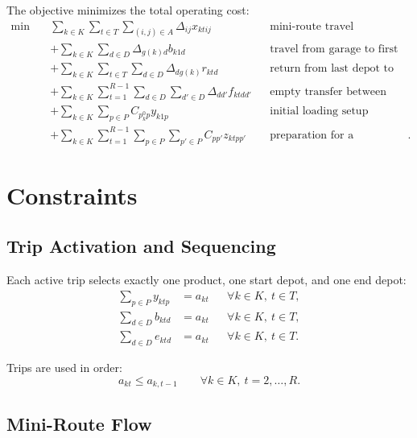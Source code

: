 \documentclass[11pt,a4paper]{article}
\begin{document}
The objective minimizes the total operating cost:
\begin{align}
\min \quad
& \sum_{k \in K}\sum_{t \in T}\sum_{(i,j)\in A}
    \Delta_{ij} x_{ktij}
    && \text{mini-route travel} \nonumber\\
& + \sum_{k \in K}\sum_{d \in D}
    \Delta_{g(k)d} b_{k1d}
    && \text{travel from garage to first depot} \nonumber\\
& + \sum_{k \in K}\sum_{t \in T}\sum_{d \in D}
    \Delta_{dg(k)} r_{ktd}
    && \text{return from last depot to garage} \nonumber\\
& + \sum_{k \in K}\sum_{t=1}^{R-1}\sum_{d \in D}\sum_{d' \in D}
    \Delta_{dd'} f_{ktdd'}
    && \text{empty transfer between depots} \nonumber\\
& + \sum_{k \in K}\sum_{p \in P}
    C_{p^0_k p} y_{k1p}
    && \text{initial loading setup} \nonumber\\
& + \sum_{k \in K}\sum_{t=1}^{R-1}\sum_{p \in P}\sum_{p' \in P}
    C_{pp'} z_{ktpp'}
    && \text{preparation for a subsequent loading}.
\label{eq:objective}
\end{align}

\section{Constraints}

\subsection{Trip Activation and Sequencing}

Each active trip selects exactly one product, one start depot, and one end
depot:
\begin{align}
    \sum_{p \in P} y_{ktp} &= a_{kt}
        && \forall k \in K,\ t \in T, \label{eq:one-product}\\
    \sum_{d \in D} b_{ktd} &= a_{kt}
        && \forall k \in K,\ t \in T, \label{eq:one-start}\\
    \sum_{d \in D} e_{ktd} &= a_{kt}
        && \forall k \in K,\ t \in T. \label{eq:one-end}
\end{align}

Trips are used in order:
\begin{equation}
    a_{kt} \leq a_{k,t-1}
    \qquad \forall k \in K,\ t=2,\ldots,R.
\label{eq:ordered-trips}
\end{equation}

\subsection{Mini-Route Flow}
\end{document}

